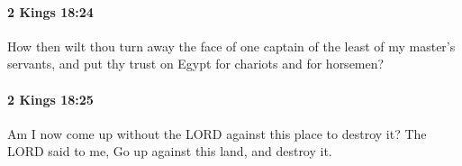 		\paragraph{2 Kings 18:24} %
			\label{2KINGS-18-24}

			How then wilt thou turn away the face of one captain of the least of my master’s servants, and put thy trust on Egypt for chariots and for horsemen?


		\paragraph{2 Kings 18:25} %
			\label{2KINGS-18-25}

			Am I now come up without the LORD against this place to destroy it? The LORD said to me, Go up against this land, and destroy it.


